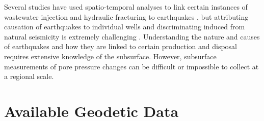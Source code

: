 
Several studies have used spatio-temporal analyses to link certain instances of wastewater injection and hydraulic fracturing to earthquakes \citep{Savvaidis2020InducedSeismicityDelaware, Skoumal2020InducedSeismicityDelaware, Grigoratos2020EarthquakesInducedWastewatera}, but attributing causation of earthquakes to individual wells and discriminating induced from natural seismicity is extremely challenging \citep{Grigoli2017CurrentChallengesMonitoring, Dahm2012RecommendationDiscriminationHuman, Verdon2019ImprovedFrameworkDiscriminating,Frohlich2016HistoricalReviewInduced, Frohlich2016ReplyCommentA}.
Understanding the nature and causes of earthquakes and how they are linked to certain production and disposal requires extensive knowledge of the subsurface.
However, subsurface measurements of pore pressure changes can be difficult or impossible to collect at a regional scale.


\section{Available Geodetic Data}
\label{sec:ch3-geodetic-data}

%



